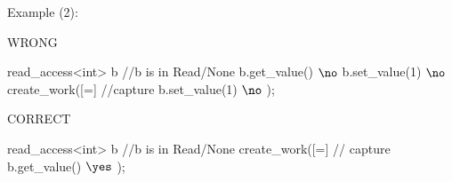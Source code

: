 Example (2): 
\hspace{-0.75cm}
\begin{minipage}[t]{0.45\linewidth}%
\centering
WRONG
\begin{vaspPseudo}
read_access<int> b
//b is in Read/None
b.get_value()   $\no$
b.set_value(1)  $\no$
create_work([=]{ //capture
  b.set_value(1) $\no$
});
\end{vaspPseudo}
\end{minipage}
\hspace{0.55cm}
\begin{minipage}[t]{0.45\linewidth}
\centering
CORRECT
\begin{vaspPseudo}
read_access<int> b
//b is in Read/None
create_work([=]{ // capture
  b.get_value()  $\yes$
});
\end{vaspPseudo}
\end{minipage}

\lstDeleteShortInline{\|}

